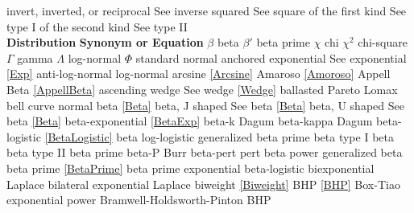 \noindent
invert, inverted, or reciprocal		\dotfill	See inverse\ncite
squared						\dotfill	See square\ncite
of the first kind					\dotfill	See type I\ncite
of the second kind				\dotfill	See type II\ncite
~\\
\noindent
{\bf Distribution} \hfill {\bf Synonym or Equation}								\ncite
%
$\beta$ 						\dotfill	beta							  	\ncite	%
$\beta'$ 						\dotfill	beta prime						\ncite	%
$\chi$ 							\dotfill	chi								\ncite	%
$\chi^2$ 						\dotfill	chi-square							\ncite 	%
$\Gamma$ 						\dotfill	gamma 							\ncite 	%
$\Lambda$						\dotfill	log-normal 						   	%
$\Phi$							\dotfill	standard normal 					\ncite	%
%
anchored exponential			\dotfill	See exponential \eqref{Exp}			\ncite	%
anti-log-normal 				\dotfill	log-normal 						\ncite	%
arcsine 						\dotfill	\eqref{Arcsine} 					  	\ncite	%
Amaroso							\dotfill	\eqref{Amoroso}					\ncite	%
Appell Beta						\dotfill	\eqref{AppellBeta}					 
ascending wedge					\dotfill	See wedge \eqref{Wedge} 			\ncite	%
%
ballasted Pareto				\dotfill	Lomax							\ncite	%
bell curve 						\dotfill	normal 							\ncite	%
beta 							\dotfill	\eqref{Beta} 						\ncite	%
beta, J shaped					\dotfill	See beta \eqref{Beta} 				\ncite	%
beta, U shaped					\dotfill	See beta \eqref{Beta} 				\ncite	%
beta-exponential				\dotfill	\eqref{BetaExp}						\ncite	%
beta-k							\dotfill	Dagum							%
beta-kappa 						\dotfill	Dagum  							%
beta-logistic					\dotfill	\eqref{BetaLogistic}					\mcite{\self}	%
beta log-logistic				\dotfill	generalized beta prime				\mcite{\self}	%
beta type I 					\dotfill	beta 								\ncite	%
beta type II 					\dotfill	beta prime						\ncite	%
beta-P 							\dotfill	Burr 				 					%
beta-pert						\dotfill	pert 								\ncite	%
beta power						\dotfill	generalized beta					\ncite	%
beta prime 						\dotfill	\eqref{BetaPrime} 					\ncite	%
beta prime exponential			\dotfill	beta-logistic						\mcite{\self} %
biexponential					\dotfill	Laplace							\ncite	%
bilateral exponential  			\dotfill	Laplace 							\ncite	%
biweight						\dotfill	\eqref{Biweight}						\ncite
BHP								\dotfill	\eqref{BHP}						\ncite	%
Box-Tiao						\dotfill	exponential power					\ncite
Bramwell-Holdsworth-Pinton 		\dotfill	BHP 								\ncite	%
